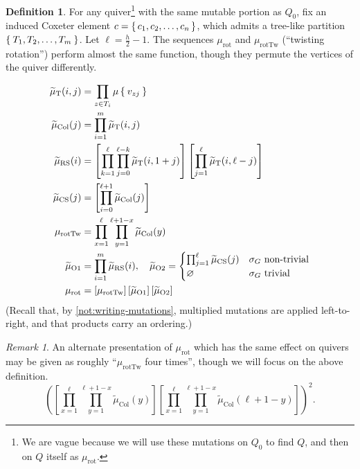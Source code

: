 \documentclass{amsart}
\theoremstyle{plain}
\theoremstyle{definition}
\newtheorem{definition}[theorem]{Definition}
\theoremstyle{remark}
\newtheorem{remark}[theorem]{Remark}
\newcommand{\murot}{{\mu_{\text{rot}}}}
\newcommand{\murottwist}{{\mu_{\text{rotTw}}}}
\newcommand{\muint}[1]{\widetilde{\mu}_{\text{#1}}}
\newcommand{\murowperm}{\muint{RS}}
\newcommand{\mucolperm}{\muint{CS}}
\newcommand{\mucol}{\muint{Col}}
\newcommand{\muT}{\muint{T}}
\begin{document}
  \begin{definition}
    \label{def:murot-components}
    For any quiver\footnote{We are vague because we will use these
      mutations on $Q_0$ to find $Q$, and then on $Q$ itself as
      $\murot$.} with the same mutable portion as $Q_0$, fix an induced
    Coxeter element $c = \set{c_1, c_2, \dotsc, c_n}$, which admits a
    tree-like partition $\Set{T_1, T_2, \dotsc, T_m}$. Let $\ell =
    \frac{h}{2} - 1$. The sequences $\murot$ and $\murottwist$
    (``twisting rotation'') perform almost the same function, though
    they permute the vertices of the quiver differently.

    \begingroup \allowdisplaybreaks
    \begin{align*}
      \muT(i,j) &= \prod_{z \in T_i} \mu\Set{v_{zj}} \\
      \mucol(j) &= \prod_{i = 1}^{m} \muT(i,j) \\
      \murowperm(i) &= \left[ \prod_{k=1}^{\ell} \prod_{j=0}^{\ell - k} \muT(i, 1 + j) \right] \left[ \prod_{j=1}^{\ell} \muT(i, \ell - j) \right] \\
      \mucolperm(j) &= \left[ \prod_{i=0}^{\ell + 1} \mucol(j) \right] \\
      \murottwist &= \prod_{x=1}^{\ell} \prod_{y = 1}^{\ell + 1 - x} \mucol(y) \\
      \muint{O1} &= \prod_{i=1}^{m} \murowperm(i), \quad \muint{O2} = \begin{cases} \prod_{j=1}^{\ell} \mucolperm(j) & \text{$\sigma_G$ non-trivial} \\ \varnothing & \text{$\sigma_G$ trivial} \end{cases}\\
      \murot &= \left[ \murottwist \right ] \left[ \muint{O1} \right] \left[ \muint{O2} \right]
    \end{align*}
    \endgroup (Recall that, by \cref{not:writing-mutations}, multiplied
    mutations are applied left-to-right, and that products carry an
    ordering.)
  \end{definition}

  \begin{remark}
    An alternate presentation of $\murot$ which has the same effect on
    quivers may be given as roughly ``$\murottwist$ four times'', though
    we will focus on the above definition. \[ \left(\left[
      \prod_{x=1}^{\ell} \prod_{y =1}^{\ell + 1 - x} \mucol(y) \right]
      \left[ \prod_{x=1}^{\ell} \prod_{y=1}^{\ell + 1 - x}
      \mucol(\ell+1-y) \right] \right)^2. \]
  \end{remark}
\end{document}
